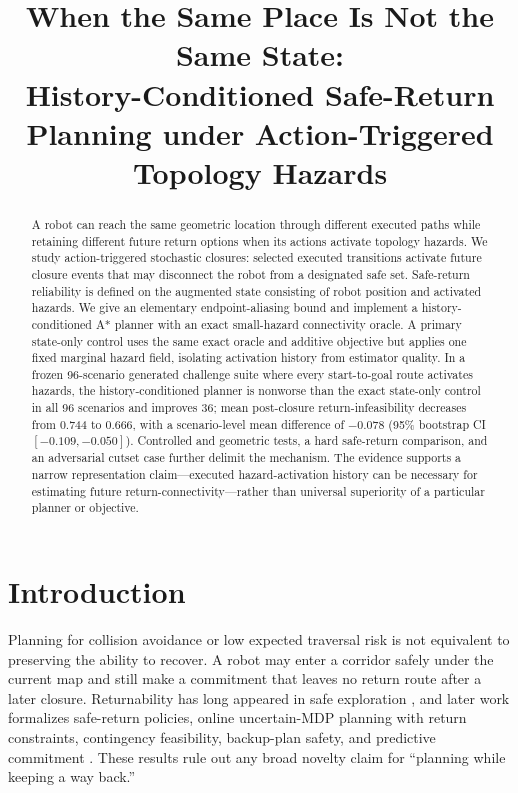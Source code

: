 \documentclass[conference]{IEEEtran}
\title{When the Same Place Is Not the Same State:\\History-Conditioned Safe-Return Planning under Action-Triggered Topology Hazards}
\author{\IEEEauthorblockN{Anonymous Author(s)}
\IEEEauthorblockA{Affiliation withheld for review}}
\begin{document}
\maketitle

\begin{abstract}
A robot can reach the same geometric location through different executed paths while retaining different future return options when its actions activate topology hazards. We study action-triggered stochastic closures: selected executed transitions activate future closure events that may disconnect the robot from a designated safe set. Safe-return reliability is defined on the augmented state consisting of robot position and activated hazards. We give an elementary endpoint-aliasing bound and implement a history-conditioned A* planner with an exact small-hazard connectivity oracle. A primary state-only control uses the same exact oracle and additive objective but applies one fixed marginal hazard field, isolating activation history from estimator quality. In a frozen 96-scenario generated challenge suite where every start-to-goal route activates hazards, the history-conditioned planner is nonworse than the exact state-only control in all 96 scenarios and improves 36; mean post-closure return-infeasibility decreases from 0.744 to 0.666, with a scenario-level mean difference of $-0.078$ (95\% bootstrap CI $[-0.109,-0.050]$). Controlled and geometric tests, a hard safe-return comparison, and an adversarial cutset case further delimit the mechanism. The evidence supports a narrow representation claim---executed hazard-activation history can be necessary for estimating future return-connectivity---rather than universal superiority of a particular planner or objective.
\end{abstract}

\section{Introduction}
Planning for collision avoidance or low expected traversal risk is not equivalent to preserving the ability to recover. A robot may enter a corridor safely under the current map and still make a commitment that leaves no return route after a later closure. Returnability has long appeared in safe exploration \cite{moldovan2012safe}, and later work formalizes safe-return policies, online uncertain-MDP planning with return constraints, contingency feasibility, backup-plan safety, and predictive commitment \cite{zhang2022online,guo2023safereturn,stephens2024safeexploration,jung2025contingency,srirangam2026scramppi,tao2024backup,han2026rcsp}. These results rule out any broad novelty claim for ``planning while keeping a way back.''
\end{document}
